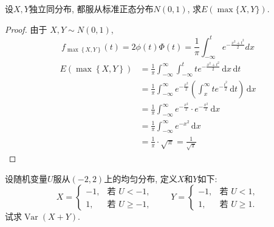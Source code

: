 \documentclass[../main.tex]{subfiles}
\begin{document}
\begin{exercise}{}{}
设$X,Y$独立同分布, 都服从标准正态分布$N(0,1)$, 求$E(\max\{X,Y\})$.
\end{exercise}
\begin{proof}
  由于 $X,Y \sim N(0,1)$,
  \[
  f_{\max \left\{ X,Y \right\}}\left( t \right)= 2 \phi(t)\Phi(t) = \frac{1}{\pi} \int_{-\infty}^{t} e^{-\frac{x^2+t^2}{2}} dx
  \]
  \[
 \begin{aligned}
  E\left( \max \left\{ X,Y \right\} \right) &= \frac{1}{\pi} \int_{-\infty}^{\infty} \int_{-\infty}^{t} t e^{-\frac{x^{2}+ t^{2} }{2 } } \,\mathrm{d} x\,\mathrm{d} t \\ 
   &= \frac{1}{\pi} \int_{-\infty}^{\infty} e^{-\frac{x^2}{2}} \left( \int_{x}^{\infty} t e^{-\frac{t^{2} }{2 } } \,\mathrm{d} t \right) \,\mathrm{d} x \\
   &= \frac{1}{\pi} \int_{-\infty}^{\infty} e^{-\frac{x^2}{2}} \cdot e^{-\frac{x^2}{2}} \,\mathrm{d} x \\
   &= \frac{1}{\pi} \int_{-\infty}^{\infty} e^{-x^2} \,\mathrm{d} x \\
   &= \frac{1}{\pi} \cdot \sqrt{\pi} = \frac{1}{\sqrt{\pi}}
 \end{aligned}
  \]
\end{proof}
\begin{exercise}{}{}
设随机变量$U$服从$(-2,2)$上的均匀分布, 定义$X$和$Y$如下:
\[
X=
\begin{cases}
-1, & \text{若 } U<-1,\\
1, & \text{若 } U\ge -1,
\end{cases}
\qquad
Y=
\begin{cases}
-1, & \text{若 } U<1,\\
1, & \text{若 } U\ge 1.
\end{cases}
\]
试求$\operatorname{Var}(X+Y)$.
\end{exercise}
\end{document}
